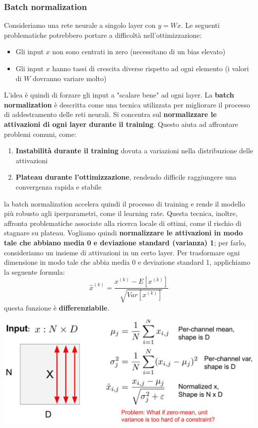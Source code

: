 \documentclass[12pt]{article}
\begin{document}
\subsubsection{Batch normalization}
Consideriamo una rete neurale a singolo layer con $y = Wx$.
Le seguenti problematiche potrebbero portare a difficoltà nell'ottimizzazione:
\begin{itemize}
    \item Gli input $x$ non sono centrati in zero (necessitano di un bias elevato)
    \item Gli input $x$ hanno tassi di crescita diverse rispetto ad ogni elemento (i valori di $W$ dovranno variare molto)
\end{itemize}
L'idea è quindi di forzare gli input a "scalare bene" ad ogni layer.
La \textbf{batch normalization} è descritta come una tecnica utilizzata per migliorare il processo di addestramento delle reti neurali.
Si concentra sul \textbf{normalizzare le attivazioni di ogni layer durante il training}. Questo aiuta ad affrontare problemi comuni, come:
\begin{enumerate}
    \item \textbf{Instabilità durante il training} dovuta a variazioni nella distribuzione delle attivazioni
    \item \textbf{Plateau durante l'ottimizzazione}, rendendo difficile raggiungere una convergenza rapida e stabile
\end{enumerate}
la batch normalization accelera quindi il processo di training e rende il modello più robusto agli iperparametri, come il learning rate.
Questa tecnica, inoltre, affronta problematiche associate alla ricerca locale di ottimi, come il rischio di stagnare su plateau.
Vogliamo quindi \textbf{normalizzare le attivazioni in modo tale che abbiano media 0 e deviazione standard (varianza) 1}; per farlo, consideriamo un insieme di attivazioni in un certo layer.
Per trasformare ogni dimensione in modo tale che abbia media 0 e deviazione standard 1, applichiamo la seguente formula:
$$\hat{x}^{(k)} = \frac{x^{(k)} - E[x^{(k)}]}{\sqrt{Var[x^{(k)}]}}$$
questa funzione è \textbf{differenziabile}.
\begin{center}
    \includegraphics[width =0.90\linewidth]{Images/139.PNG}
\end{center}
\end{document}

